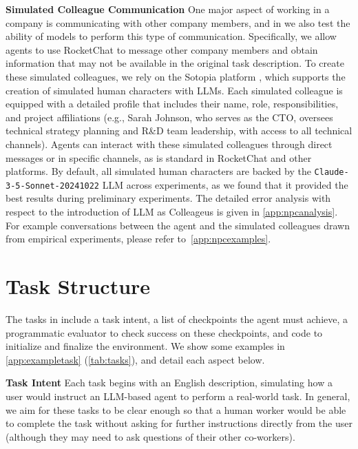 \documentclass{article}
\begin{document}
\noindent \textbf{Simulated Colleague Communication} \quad
One major aspect of working in a company is communicating with other company members, and in \tac we also test the ability of models to perform this type of communication.
Specifically, we allow agents to use RocketChat to message other company members and obtain information that may not be available in the original task description. 
To create these simulated colleagues, we rely on the Sotopia platform \citep{zhou2024sotopia}, which supports the creation of simulated human characters with LLMs.
Each simulated colleague is equipped with a detailed profile that includes their name, role, responsibilities, and project affiliations (e.g., Sarah Johnson, who serves as the CTO, oversees technical strategy planning and R\&D team leadership, with access to all technical channels). 
Agents can interact with these simulated colleagues through direct messages or in specific channels, as is standard in RocketChat and other platforms.
By default, all simulated human characters are backed by the \texttt{Claude-3-5-Sonnet-20241022} LLM across experiments, as we found that it provided the best results during preliminary experiments. The detailed error analysis with respect to the introduction of LLM as Colleageus is given in \autoref{app:npcanalysis}. 
For example conversations between the agent and the simulated colleagues drawn from empirical experiments, please refer to~\autoref{app:npcexamples}.


\section{Task Structure}
\label{sec:task_structure}
The tasks in \tac include a task intent, a list of checkpoints the agent must achieve, a programmatic evaluator to check success on these checkpoints, and code to initialize and finalize the environment.
We show some examples in \autoref{app:exampletask} (\autoref{tab:tasks}), and detail each aspect below.


\noindent \textbf{Task Intent} \quad
Each task begins with an English description, simulating how a user would instruct an LLM-based agent to perform a real-world task.
In general, we aim for these tasks to be clear enough so that a human worker would be able to complete the task without asking for further instructions directly from the user (although they may need to ask questions of their other co-workers).
\end{document}
